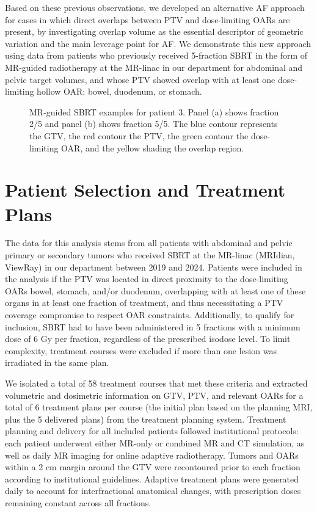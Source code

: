 \documentclass[11pt]{article}
\begin{document}
Based on these previous observations, we developed an alternative AF approach for cases in which direct overlaps between PTV and dose-limiting OARs are present, by investigating overlap volume as the essential descriptor of geometric variation and the main leverage point for AF. We demonstrate this new approach using data from patients who previously received 5-fraction SBRT in the form of MR-guided radiotherapy at the MR-linac in our department for abdominal and pelvic target volumes, and whose PTV showed overlap with at least one dose-limiting hollow OAR: bowel, duodenum, or stomach.

\begin{figure}[ht]
\centering
{}
\caption{MR-guided SBRT examples for patient 3. Panel (a) shows fraction 2/5 and panel (b) shows fraction 5/5. The blue contour represents the GTV, the red contour the PTV, the green contour the dose-limiting OAR, and the yellow shading the overlap region.}
\label{fig:overview-patient3}
\end{figure}

\section{Patient Selection and Treatment Plans}

The data for this analysis stems from all patients with abdominal and pelvic primary or secondary tumors who received SBRT at the MR-linac (MRIdian, ViewRay) in our department between 2019 and 2024. Patients were included in the analysis if the PTV was located in direct proximity to the dose-limiting OARs bowel, stomach, and/or duodenum, overlapping with at least one of these organs in at least one fraction of treatment, and thus necessitating a PTV coverage compromise to respect OAR constraints. Additionally, to qualify for inclusion, SBRT had to have been administered in 5 fractions with a minimum dose of 6 Gy per fraction, regardless of the prescribed isodose level. To limit complexity, treatment courses were excluded if more than one lesion was irradiated in the same plan.

We isolated a total of 58 treatment courses that met these criteria and extracted volumetric and dosimetric information on GTV, PTV, and relevant OARs for a total of 6 treatment plans per course (the initial plan based on the planning MRI, plus the 5 delivered plans) from the treatment planning system. Treatment planning and delivery for all included patients followed institutional protocols: each patient underwent either MR-only or combined MR and CT simulation, as well as daily MR imaging for online adaptive radiotherapy. Tumors and OARs within a 2 cm margin around the GTV were recontoured prior to each fraction according to institutional guidelines. Adaptive treatment plans were generated daily to account for interfractional anatomical changes, with prescription doses remaining constant across all fractions.
\end{document}
